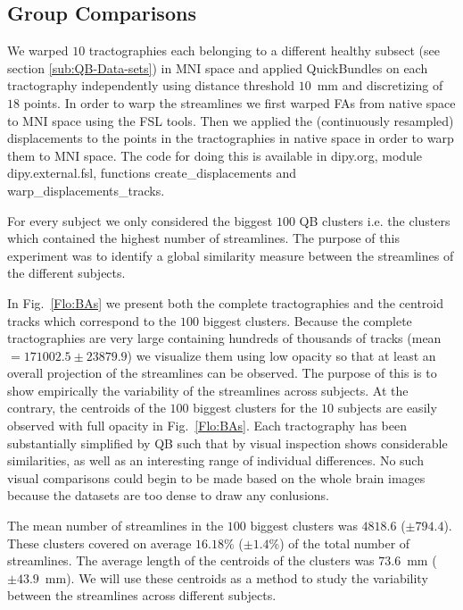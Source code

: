 \documentclass{bioinfo}
\begin{document}
\subsection{Group Comparisons \label{sub:group_comp}}

We warped $10$ tractographies each belonging to a different healthy
subsect (see section \ref{sub:QB-Data-sets}) in MNI space and applied
QuickBundles on each tractography independently using distance threshold
$10$~mm and discretizing of $18$ points.  In order to warp the
streamlines we first warped FAs from native space to MNI space using the
FSL tools. Then we applied the (continuously resampled) displacements to
the points in the tractographies in native space in order to warp them
to MNI space. The code for doing this is available in dipy.org, module
dipy.external.fsl, functions create\_displacements and
warp\_displacements\_tracks.

For every subject we
only considered the biggest $100$ QB clusters i.e. the clusters which
contained the highest number of streamlines. The purpose of this
experiment was to identify a global similarity measure between the
streamlines of the different subjects.

In Fig.~\ref{Flo:BAs} we present both the complete tractographies and
the centroid tracks which correspond to the $100$ biggest
clusters. Because the complete tractographies are very large containing
hundreds of thousands of tracks (mean$=\num{171002.5}\pm\num{23879.9}$)
we visualize them using low opacity so that at least an overall
projection of the streamlines can be observed. The purpose of this is to
show empirically the variability of the streamlines across subjects. At
the contrary, the centroids of the $100$ biggest clusters for the $10$
subjects are easily observed with full opacity in
Fig.~\ref{Flo:BAs}. Each tractography has been substantially simplified
by QB such that by visual inspection shows considerable similarities, as
well as an interesting range of individual differences. No such visual
comparisons could begin to be made based on the whole brain images
because the datasets are too dense to draw any conlusions.

The mean number of streamlines in the $100$ biggest
clusters was $\num{4818.6}$ ($\pm \num{794.4}$). These clusters covered
on average $16.18\%$ ($\pm\num{1.4}\%$) of the total number of
streamlines. The average length of the centroids of the clusters was
$73.6$~mm ($\pm\num{43.9}$~mm). We will use these centroids as a method
to study the variability between the streamlines across different
subjects.
\end{document}
